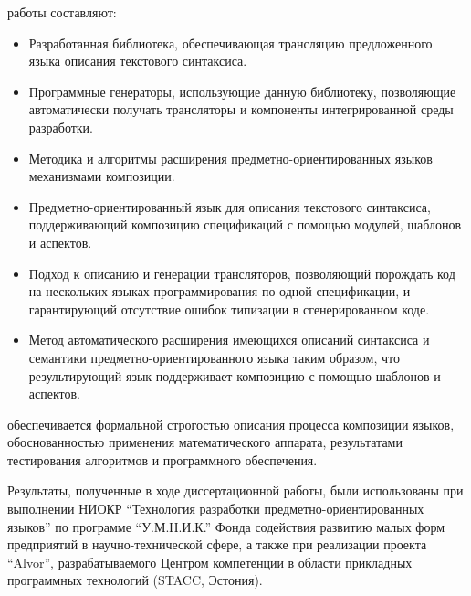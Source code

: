  работы составляют:
\begin{itemize}
\item Разработанная библиотека, обеспечивающая трансляцию предложенного языка описания текстового синтаксиса.
\item Программные генераторы, использующие данную библиотеку, позволяющие автоматически получать трансляторы и компоненты интегрированной среды разработки.
\item Методика и алгоритмы расширения предметно-ориентированных языков механизмами композиции.
\end{itemize}

\begin{itemize}
\item Предметно-ориентированный язык для описания текстового синтаксиса, поддерживающий композицию спецификаций с помощью модулей, шаблонов и аспектов.
\item Подход к описанию и генерации трансляторов, позволяющий порождать код на нескольких языках программирования по одной спецификации, и гарантирующий отсутствие ошибок типизации в сгенерированном коде.
\item Метод автоматического расширения имеющихся описаний синтаксиса и семантики предметно-ориентированного языка таким образом, что результирующий язык поддерживает композицию с помощью шаблонов и аспектов.
\end{itemize}

 обеспечивается формальной строгостью описания процесса композиции языков, обоснованностью применения математического аппарата, результатами тестирования алгоритмов и программного обеспечения.

 Результаты, полученные в ходе диссертационной работы, 
были использованы 
при выполнении НИОКР ``Технология разработки предметно-ориентированных языков'' по программе ``У.М.Н.И.К.'' Фонда содействия развитию малых форм предприятий в научно-технической сфере, а также 
при реализации проекта ``Alvor'', разрабатываемого Центром компетенции в области прикладных программных технологий (STACC, Эстония).

